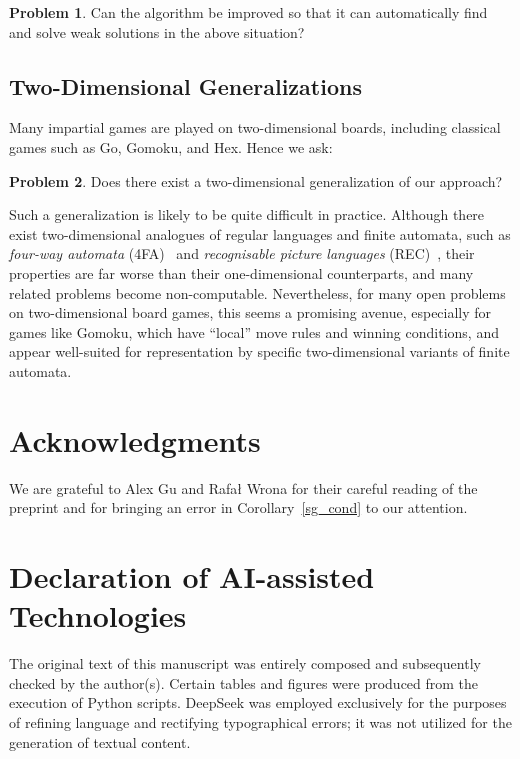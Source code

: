 \documentclass[11pt]{article}
\theoremstyle{definition}
\newtheorem{problem}{Problem}[section]
\theoremstyle{plain}
\begin{document}
\begin{problem}
    Can the algorithm be improved so that it can automatically find and solve weak solutions in the above situation?
\end{problem}

\subsection{Two-Dimensional Generalizations}

Many impartial games are played on two-dimensional boards, including classical games such as Go, Gomoku, and Hex. Hence we ask:

\begin{problem}
    Does there exist a two-dimensional generalization of our approach?
\end{problem}

Such a generalization is likely to be quite difficult in practice.
Although there exist two-dimensional analogues of regular languages and finite automata, such as \textit{four-way automata} (4FA)~\cite{2dFA1967} and \textit{recognisable picture languages} (REC)~\cite{2dFA1997},
their properties are far worse than their one-dimensional counterparts, and many related problems become non-computable.
Nevertheless, for many open problems on two-dimensional board games, this seems a promising avenue,
especially for games like Gomoku, which have ``local'' move rules and winning conditions, and appear well-suited for representation by specific two-dimensional variants of finite automata.

\section*{Acknowledgments}
We are grateful to Alex Gu and Rafał Wrona for their careful reading of the preprint and for bringing an error in Corollary~\ref{sg_cond} to our attention.

\section*{Declaration of AI-assisted Technologies}

The original text of this manuscript was entirely composed and subsequently checked by the author(s).
Certain tables and figures were produced from the execution of Python scripts.
DeepSeek was employed exclusively for the purposes of refining language and rectifying typographical errors; it was not utilized for the generation of textual content.



\end{document}
